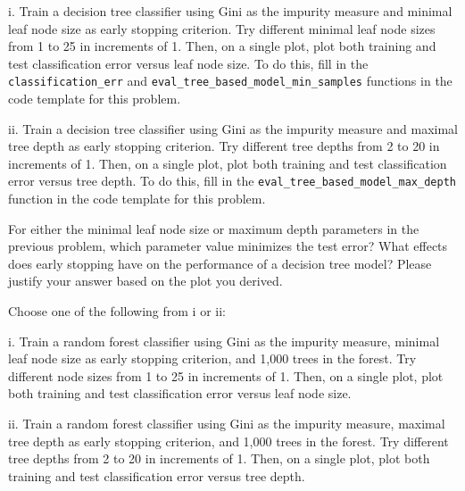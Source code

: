 \noindent i. Train a decision tree classifier using Gini as the impurity measure and minimal leaf node size as early stopping criterion. Try different minimal leaf node sizes from 1 to 25 in increments of 1. Then, on a single plot, plot both training and test classification error versus leaf node size. To do this, fill in the \texttt{classification_err} and \texttt{eval_tree_based_model_min_samples} functions in the code template for this problem.


ii. Train a decision tree classifier using Gini as the impurity measure and maximal tree depth as early stopping criterion. Try different tree depths from 2 to 20 in increments of 1. Then, on a single plot, plot both training and test classification error versus tree depth. To do this, fill in the \texttt{eval_tree_based_model_max_depth} function in the code template for this problem.

\begin{solution}
 
\end{solution}

\problem[6]
For either the minimal leaf node size or maximum depth parameters in the previous problem, which parameter value minimizes the test error? What effects does early stopping have on the performance of a decision tree model?
Please justify your answer based on the plot you derived.

\begin{solution}
   
\end{solution}

\indent\problem[4] Choose one of the following from i or ii: \smallskip 

\noindent i. Train a random forest classifier using Gini as the impurity measure, minimal leaf node size as early stopping criterion, and 1,000 trees in the forest. Try different node sizes from 1 to 25 in increments of 1. Then, on a single plot, plot both training and test classification error versus
leaf node size.

ii. Train a random forest classifier using Gini as the impurity measure, maximal tree depth as early stopping criterion, and 1,000 trees in the forest. Try different tree depths from 2 to 20 in increments of 1. Then, on a single plot, plot both training and test classification error versus tree depth.

\begin{solution}

\end{solution}

